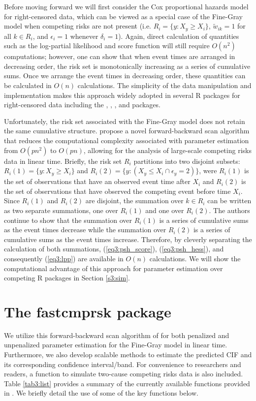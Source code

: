 Before moving forward we will first consider the Cox proportional hazards model for right-censored data, which can be viewed as a special case of the Fine-Gray model when competing risks are not present (i.e. $R_i = \{y: X_y \geq X_i\}$, $\tilde{w}_{ik} = 1$ for all $k \in R_i$, and $\epsilon_i = 1$ whenever $\delta_i = 1$). Again, direct calculation of quantities such as the log-partial likelihood and score function will still require $O(n^2)$ computations; however, one can show that when event times are arranged in decreasing order, the risk set is monotonically increasing as a series of cumulative sums. Once we arrange the event times in decreasing order, these quantities can be calculated in $O(n)$ calculations. The simplicity of the data manipulation and implementation makes this approach widely adopted in several R packages for right-censored data including the , , , and  packages.  

Unfortunately, the risk set associated with the Fine-Gray model does not retain the same cumulative structure. \cite{kawaguchi2019scalable} propose a novel forward-backward scan algorithm that reduces the computational complexity associated with parameter estimation from $O(pn^2)$ to $O(pn)$, allowing for the analysis of large-scale competing risks data in linear time. Briefly, the risk set $R_i$ partitions into two disjoint subsets: $R_i(1) = \{y:X_y \geq X_i\}$ and $R_i(2) = \{y:(X_y \leq X_i \cap \epsilon_y =  2) \}$, were $R_i(1)$ is the set of observations that have an observed event time after $X_i$ and $R_i(2)$ is the set of observations that have observed the competing event before time $X_i$. Since $R_i(1)$ and $R_i(2)$ are disjoint, the summation over $k \in R_i$ can be written as two separate summations, one over $R_i(1)$ and one over $R_i(2)$. The authors continue to show that the summation over $R_i(1)$ is a series of cumulative sums as the event times decrease while the summation over $R_i(2)$ is a series of cumulative sums as the event times increase. Therefore, by cleverly separating the calculation of both summations, (\ref{eq3:psh_score}), (\ref{eq3:psh_hess}), and consequently (\ref{eq3:lpp}) are available in $O(n)$ calculations. We will show the computational advantage of this approach for parameter estimation over competing R packages in Section \ref{s3:sim}.


\section{The fastcmprsk package}
\label{s3:pkg}
We utilize this forward-backward scan algorithm of \cite{kawaguchi2019scalable} for both penalized and unpenalized parameter estimation for the  Fine-Gray model in linear time. Furthermore, we also develop scalable methods to estimate the predicted CIF and its corresponding confidence interval/band. For convenience to researchers and readers, a function to simulate two-cause competing risks data is also included. Table \ref{tab3:list} provides a summary of the currently available functions provided in . We briefly detail the use of some of the key functions below.

